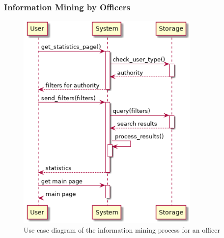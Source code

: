 \subsubsection{Information Mining by Officers}

\newpage
\begin{figure}[htp]
	\centering
	\includegraphics[width=0.8\textwidth]{images/useCases/information_mining_by_officers.png}
	\caption{Use case diagram of the information mining process for an officer}
	\label{fig:reportmanagement}
\end{figure}
\newpage


